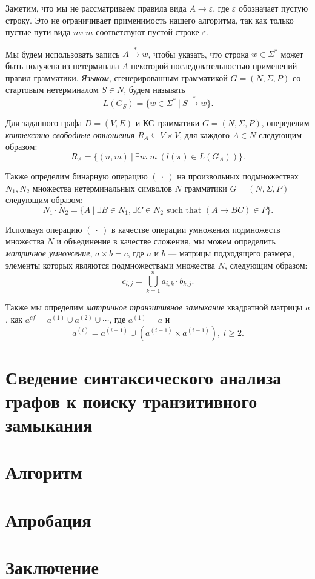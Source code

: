 \documentclass [a4paper] {article}
\begin{document}
	Заметим, что мы не рассматриваем правила вида $A \rightarrow \varepsilon$, где $\varepsilon$ обозначает пустую строку. Это не ограничивает применимость нашего алгоритма, так как только пустые пути вида $m \pi m$ соответсвуют пустой строке $\varepsilon$.
	
	Мы будем использовать запись $A \xrightarrow{*} w$, чтобы указать, что строка $w \in \Sigma^*$ может быть получена из нетерминала $A$ некоторой последовательностью применений правил грамматики. \textit{Языком}, сгенерированным грамматикой $G = (N,\Sigma,P)$ со стартовым нетерминалом $S \in N$, будем называть $$L(G_S) = \{w \in \Sigma^*~|~S \xrightarrow{*} w\}.$$

	Для заданного графа $D = (V, E)$ и КС-грамматики $G = (N, \Sigma, P)$, опеределим \textit{контекстно-свободные отношения} $R_A \subseteq V \times V$, для каждого $A \in N$ следующим образом: $$R_A = \{(n,m)~|~\exists n \pi m~(l(\pi) \in L(G_A))\}.$$
	
	Также определим бинарную операцию $(~\cdot~)$ на произвольных подмножествах $N_1 , N_2$ множества нетерминальных символов $N$ грамматики $G = (N, \Sigma, P)$ следующим образом: $$N_1 \cdot N_2 = \{A~|~\exists B \in N_1, \exists C \in N_2 \text{ such that }(A \rightarrow B C) \in P\}.$$
	
	Используя операцию $(~\cdot~)$ в качестве операции умножения подмножеств множества $N$ и объединение в качестве сложения, мы можем определить \textit{матричное умножение}, $a \times b = c$, где $a$ и $b$ --- матрицы подходящего размера, элементы которых являются подмножествами множества $N$, следующим образом: $$c_{i,j} = \bigcup^{n}_{k=1}{a_{i,k} \cdot b_{k,j}}.$$
	
	Также мы определим \textit{матричное транзитивное замыкание} квадратной матрицы $a$, как $a^{cf} = a^{(1)} \cup a^{(2)} \cup \cdots$, где $a^{(1)} = a$ и $$a^{(i)} = a^{(i-1)} \cup (a^{(i-1)} \times a^{(i-1)}), ~i \ge 2.$$
	\section{Сведение синтаксического анализа графов к поиску транзитивного замыкания}
	\section{Алгоритм}
	\section{Апробация}
	\section{Заключение}
	
	
	\printbibliography
	
\end{document}
